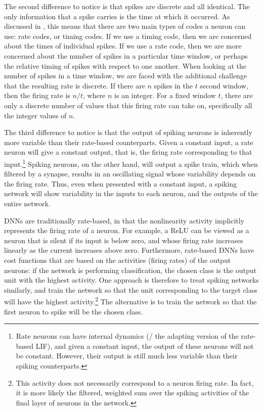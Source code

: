The second difference to notice is that spikes are discrete
and all identical.
The only information that a spike carries is the time at which it occurred.
As discussed in , this means that there are two main types of codes
a neuron can use: rate codes, or timing codes.
If we use a timing code, then we are concerned about the times of individual spikes.
If we use a rate code, then we are more concerned about the number of spikes
in a particular time window,
or perhaps the relative timing of spikes with respect to one another.
When looking at the number of spikes in a time window,
we are faced with the additional challenge that the resulting rate is discrete.
If there are $n$ spikes in the $t$ second window,
then the firing rate is $n / t$, where $n$ is an integer.
For a fixed window $t$, there are only a discrete number of values that
this firing rate can take on,
specifically all the integer values of $n$.

The third difference to notice is that the output of spiking neurons is
inherently more variable than their rate-based counterparts.
Given a constant input, a rate neuron will give a constant output,
that is, the firing rate corresponding to that input.\footnote{
  Rate neurons can have internal dynamics
  (\eg/ the adapting version of the rate-based LIF),
  and given a constant input, the output of these neurons will not be constant.
  However, their output is still much less variable
  than their spiking counterparts.}
Spiking neurons, on the other hand, will output a spike train,
which when filtered by a synapse,
results in an oscillating signal
whose variability depends on the firing rate.
Thus, even when presented with a constant input,
a spiking network will show variability in the inputs to each neuron,
and the outputs of the entire network.

DNNs are traditionally rate-based,
in that the nonlinearity activity implicitly represents the firing rate of a neuron.
For example, a ReLU can be viewed as a neuron that is silent if its input is below zero,
and whose firing rate increases linearly as the current increases above zero.
Furthermore, rate-based DNNs have cost functions that are based on
the activities (firing rates) of the output neurons:
if the network is performing classification,
the chosen class is the output unit with the highest activity.
One approach is therefore to treat spiking networks similarly,
and train the network so that the unit corresponding to the target class
will have the highest activity.\footnote{
  This activity does not necessarily correspond to a neuron firing rate.
  In fact, it is more likely the filtered, weighted sum over the spiking activities
  of the final layer of neurons in the network.}
The alternative is to train the network so that the first neuron to spike
will be the chosen class.

